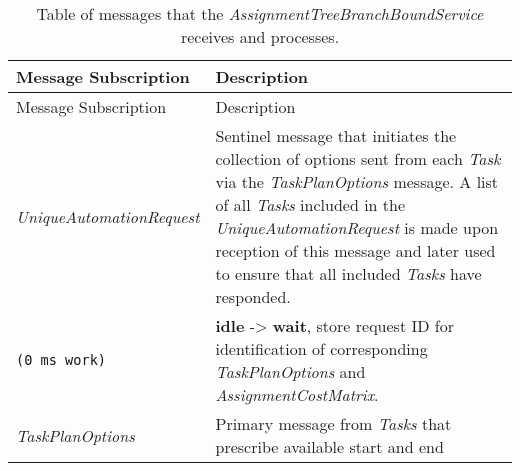 \begin{longtable}[c]{@{}ll@{}}
\caption{Table of messages that the
\emph{AssignmentTreeBranchBoundService} receives and
processes.}\tabularnewline
\toprule
\begin{minipage}[b]{0.29\columnwidth}\raggedright\strut
Message Subscription
\strut\end{minipage} &
\begin{minipage}[b]{0.65\columnwidth}\raggedright\strut
Description
\strut\end{minipage}\tabularnewline
\midrule
\endfirsthead
\toprule
\begin{minipage}[b]{0.29\columnwidth}\raggedright\strut
Message Subscription
\strut\end{minipage} &
\begin{minipage}[b]{0.65\columnwidth}\raggedright\strut
Description
\strut\end{minipage}\tabularnewline
\midrule
\endhead
\begin{minipage}[t]{0.29\columnwidth}\raggedright\strut
\emph{UniqueAutomationRequest}
\strut\end{minipage} &
\begin{minipage}[t]{0.65\columnwidth}\raggedright\strut
Sentinel message that initiates the collection of options sent from each
\emph{Task} via the \emph{TaskPlanOptions} message. A list of all
\emph{Tasks} included in the \emph{UniqueAutomationRequest} is made upon
reception of this message and later used to ensure that all included
\emph{Tasks} have responded.
\strut\end{minipage}\tabularnewline
\begin{minipage}[t]{0.29\columnwidth}\raggedright\strut
\begin{verbatim}
(0 ms work)
\end{verbatim}
\strut\end{minipage} &
\begin{minipage}[t]{0.65\columnwidth}\raggedright\strut
\textbf{idle} -\textgreater{} \textbf{wait}, store request ID for
identification of corresponding \emph{TaskPlanOptions} and
\emph{AssignmentCostMatrix}.
\strut\end{minipage}\tabularnewline
\begin{minipage}[t]{0.29\columnwidth}\raggedright\strut
\emph{TaskPlanOptions}
\strut\end{minipage} &
\begin{minipage}[t]{0.65\columnwidth}\raggedright\strut
Primary message from \emph{Tasks} that prescribe available start and end

\end{minipage}
\end{longtable}
